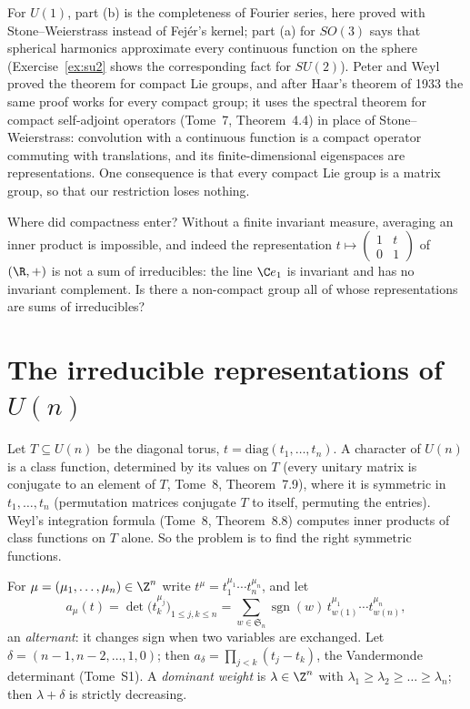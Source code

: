 For $U(1)$, part (b) is the completeness of Fourier series, here proved with Stone--Weierstrass instead of Fejér's kernel; part (a) for $SO(3)$ says that spherical harmonics approximate every continuous function on the sphere (Exercise~\ref{ex:su2}
shows the corresponding fact for $SU(2)$). Peter and Weyl proved the theorem for compact Lie groups, and after Haar's theorem of 1933 the same proof works for every compact group; it uses the spectral theorem for compact self-adjoint operators (Tome~7, Theorem~4.4) in place of Stone--Weierstrass: convolution with a continuous function
is a compact operator commuting with translations, and its finite-dimensional eigenspaces are representations. One consequence is that every compact Lie group is a matrix group, so that our restriction loses nothing.

\begin{think}
Where did compactness enter? Without a finite invariant measure, averaging an inner product is impossible, and indeed the representation $t\mapsto\begin{pmatrix}1&t\\0&1\end{pmatrix}$ of $(\R,+)$ is not a sum of irreducibles: the line $\C e_1$ is
invariant and has no invariant complement. Is there a non-compact group all of whose representations are sums of irreducibles?
\end{think}

\section{The irreducible representations of \texorpdfstring{$U(n)$}{U(n)}}

Let $T\subseteq U(n)$ be the diagonal torus, $t=\mathrm{diag}(t_1,\dots,t_n)$. A character of $U(n)$ is a class function, determined by its values on $T$ (every unitary matrix is conjugate to an element of $T$, Tome~8, Theorem~7.9), where it is
symmetric in $t_1,\dots,t_n$ (permutation matrices conjugate $T$ to itself, permuting the entries). Weyl's integration formula (Tome~8, Theorem~8.8) computes inner products of class functions on $T$ alone. So the problem is to find the right symmetric functions.

For $\mu=(\mu_1,\dots,\mu_n)\in\Z^n$ write $t^\mu=t_1^{\mu_1}\cdots t_n^{\mu_n}$, and let
\[
a_\mu(t)=\det\bigl(t_k^{\mu_j}\bigr)_{1\le j,k\le n}=\sum_{w\in\mathfrak S_n}\operatorname{sgn}(w)\,t_{w(1)}^{\mu_1}\cdots t_{w(n)}^{\mu_n},
\]
an \emph{alternant}: it changes sign when two variables are exchanged. Let $\delta=(n-1,n-2,\dots,1,0)$; then $a_\delta=\prod_{j<k}(t_j-t_k)$, the Vandermonde determinant (Tome~S1). A \emph{dominant weight} is $\lambda\in\Z^n$ with $\lambda_1\ge\lambda_2\ge\dots\ge\lambda_n$;
then $\lambda+\delta$ is strictly decreasing.

